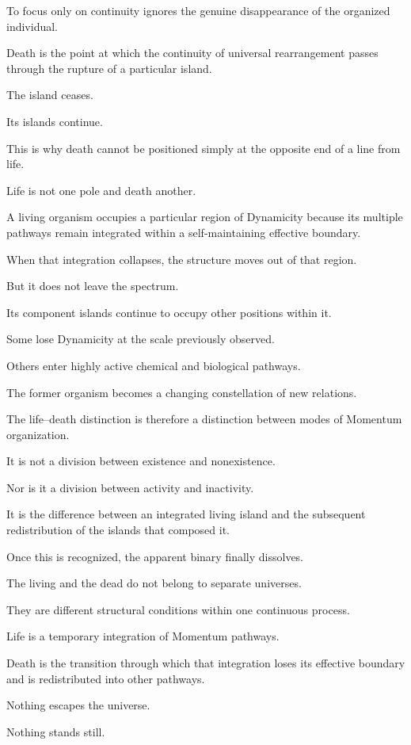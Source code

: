 To focus only on continuity ignores the genuine disappearance of the organized individual.

Death is the point at which the continuity of universal rearrangement passes through the rupture of a particular island.

The island ceases.

Its islands continue.

This is why death cannot be positioned simply at the opposite end of a line from life.

Life is not one pole and death another.

A living organism occupies a particular region of Dynamicity because its multiple pathways remain integrated within a self-maintaining effective boundary.

When that integration collapses, the structure moves out of that region.

But it does not leave the spectrum.

Its component islands continue to occupy other positions within it.

Some lose Dynamicity at the scale previously observed.

Others enter highly active chemical and biological pathways.

The former organism becomes a changing constellation of new relations.

The life–death distinction is therefore a distinction between modes of Momentum organization.

It is not a division between existence and nonexistence.

Nor is it a division between activity and inactivity.

It is the difference between an integrated living island and the subsequent redistribution of the islands that composed it.

Once this is recognized, the apparent binary finally dissolves.

The living and the dead do not belong to separate universes.

They are different structural conditions within one continuous process.

Life is a temporary integration of Momentum pathways.

Death is the transition through which that integration loses its effective boundary and is redistributed into other pathways.

Nothing escapes the universe.

Nothing stands still.

